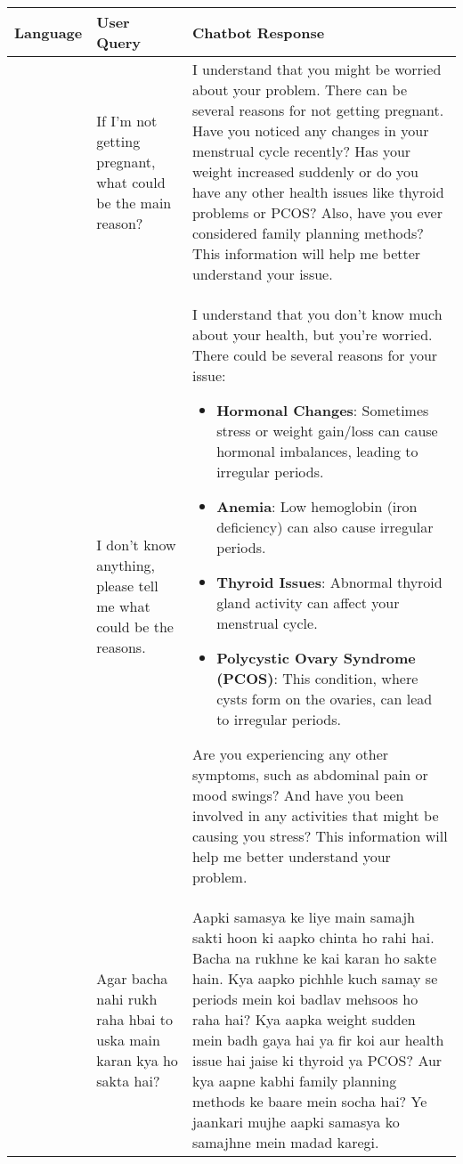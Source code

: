 \begin{table*}[ht]
\centering
\fontsize{7}{8}\selectfont
\begin{tabular}{>{\raggedright\arraybackslash}p{2cm} p{2.5cm} p{9.5cm}}
\toprule
\textbf{Language} & \textbf{User Query} & \textbf{Chatbot Response} \\
\midrule
\multirow{2}{*}{English (Translated)}  & If I'm not getting pregnant, what could be the main reason? & I understand that you might be worried about your problem. There can be several reasons for not getting pregnant. Have you noticed any changes in your menstrual cycle recently? Has your weight increased suddenly or do you have any other health issues like thyroid problems or PCOS? Also, have you ever considered family planning methods? This information will help me better understand your issue. \\
\cmidrule{2-3}
& I don’t know anything, please tell me what could be the reasons. & I understand that you don’t know much about your health, but you’re worried. There could be several reasons for your issue:
\begin{itemize}
    \item \textbf{Hormonal Changes}: Sometimes stress or weight gain/loss can cause hormonal imbalances, leading to irregular periods.
    \item \textbf{Anemia}: Low hemoglobin (iron deficiency) can also cause irregular periods.
    \item \textbf{Thyroid Issues}: Abnormal thyroid gland activity can affect your menstrual cycle.
    \item \textbf{Polycystic Ovary Syndrome (PCOS)}: This condition, where cysts form on the ovaries, can lead to irregular periods.
\end{itemize}
Are you experiencing any other symptoms, such as abdominal pain or mood swings? And have you been involved in any activities that might be causing you stress? This information will help me better understand your problem. \\
\midrule
\multirow{2}{*}{Hinglish} & Agar bacha nahi rukh raha hbai to uska main karan kya ho sakta hai? & Aapki samasya ke liye main samajh sakti hoon ki aapko chinta ho rahi hai. Bacha na rukhne ke kai karan ho sakte hain. Kya aapko pichhle kuch samay se periods mein koi badlav mehsoos ho raha hai? Kya aapka weight sudden mein badh gaya hai ya fir koi aur health issue hai jaise ki thyroid ya PCOS? Aur kya aapne kabhi family planning methods ke baare mein socha hai? Ye jaankari mujhe aapki samasya ko samajhne mein madad karegi. \\

\end{tabular}
\end{table*}
